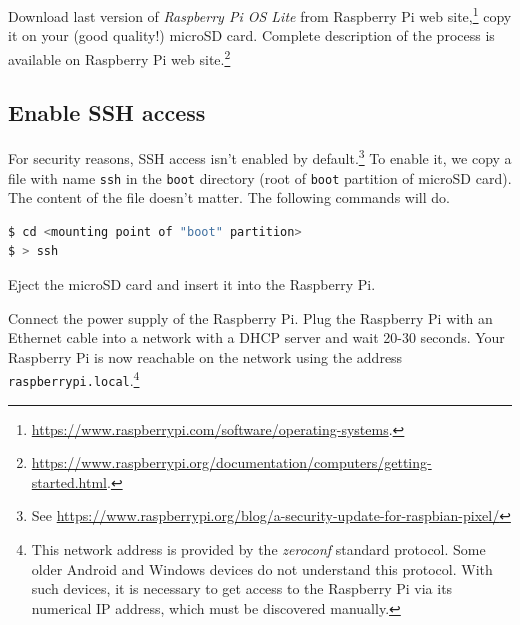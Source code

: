 \documentclass[12pt]{article}
\begin{document}
Download last version of \emph{Raspberry Pi OS Lite} from Raspberry Pi web site,\footnote{\url{https://www.raspberrypi.com/software/operating-systems}.} copy it on your (good quality!) microSD card.
Complete description of the process is available on Raspberry Pi web site.\footnote{\url{https://www.raspberrypi.org/documentation/computers/getting-started.html}.}

\subsection{Enable SSH access}

For security reasons, SSH access isn't enabled by default.\footnote{See \url{https://www.raspberrypi.org/blog/a-security-update-for-raspbian-pixel/}}
To enable it, we copy a file with name \lstinline{ssh} in the \lstinline{boot} directory (root of \lstinline{boot} partition of microSD card).
The content of the file doesn't matter.
The following commands will do.

\begin{lstlisting}[language=bash]
$ cd <mounting point of "boot" partition>
$ > ssh
\end{lstlisting}

Eject the microSD card and insert it into the Raspberry Pi.

Connect the power supply of the Raspberry Pi.
Plug the Raspberry Pi with an Ethernet cable into a network with a DHCP server and wait 20-30 seconds.
Your Raspberry Pi is now reachable on the network using the address \lstinline{raspberrypi.local}.\footnote{This network address is provided by the \emph{zeroconf} standard protocol.
Some older Android and Windows devices do not understand this protocol.
With such devices, it is necessary to get access to the Raspberry Pi via its numerical IP address, which must be discovered manually.}

\end{document}
